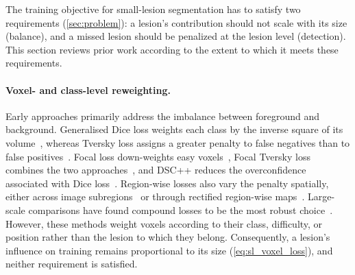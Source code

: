 The training objective for small-lesion segmentation has to satisfy two
requirements (\cref{sec:problem}): a lesion's contribution should not
scale with its size (balance), and a missed lesion should be penalized at
the lesion level (detection). This section reviews prior work according
to the extent to which it meets these requirements.

\paragraph{Voxel- and class-level reweighting.}
Early approaches primarily address the imbalance between foreground and
background. Generalised Dice loss weights each class by the inverse square
of its volume~\cite{sudre_generalised_2017}, whereas Tversky loss assigns a
greater penalty to false negatives than to false
positives~\cite{salehi_tversky_2017}. Focal loss down-weights easy
voxels~\cite{lin_focal_2017}, Focal Tversky loss combines the two
approaches~\cite{abraham_novel_2019}, and DSC++ reduces the overconfidence
associated with Dice loss~\cite{yeung_calibrating_2023}. Region-wise losses
also vary the penalty spatially, either across image
subregions~\cite{chen_adaptive_2023} or through rectified region-wise
maps~\cite{valverde_region-wise_2023}. Large-scale comparisons have found
compound losses to be the most robust choice~\cite{ma_loss_2021,azad_loss_2023}.
However, these methods weight voxels according to their class, difficulty,
or position rather than the lesion to which they belong. Consequently, a
lesion's influence on training remains proportional to its size
(\cref{eq:sl_voxel_loss}), and neither requirement is satisfied.

